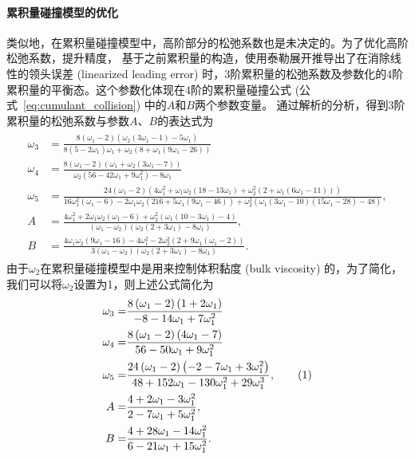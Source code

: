 \paragraph{累积量碰撞模型的优化}
类似地，在累积量碰撞模型中，高阶部分的松弛系数也是未决定的。为了优化高阶松弛系数，提升精度，\citet{Geier-2017} 基于之前累积量的构造，使用泰勒展开推导出了在消除线性的领头误差 (linearized leading error) 时，3阶累积量的松弛系数及参数化的4阶累积量的平衡态。这个参数化体现在4阶的累积量碰撞公式 (公式~\ref{eq:cumulant_collision}) 中的$A$和$B$两个参数变量。\citet{Geier-2017} 通过解析的分析，得到3阶累积量的松弛系数与参数$A$、$B$的表达式为
\begin{align}
    \begin{split}   
\omega_{3} &= \frac{8\left(\omega_{1}-2\right)\left(\omega_{2}\left(3 \omega_{1}-1\right)-5 \omega_{1}\right)}{8\left(5-2 \omega_{1}\right) \omega_{1}+\omega_{2}\left(8+\omega_{1}\left(9 \omega_{1}-26\right)\right)} \\
\omega_{4} &= \frac{8\left(\omega_{1}-2\right)\left(\omega_{1}+\omega_{2}\left(3 \omega_{1}-7\right)\right)}{\omega_{2}\left(56-42 \omega_{1}+9 \omega_{1}^{2}\right)-8 \omega_{1}} \\
\omega_{5} &= \frac{24\left(\omega_{1}-2\right)\left(4 \omega_{1}^{2}+\omega_{1} \omega_{2}\left(18-13 \omega_{1}\right)+\omega_{2}^{2}\left(2+\omega_{1}\left(6 \omega_{1}-11\right)\right)\right)}{16 \omega_{1}^{2}\left(\omega_{1}-6\right)-2 \omega_{1} \omega_{2}\left(216+5 \omega_{1}\left(9 \omega_{1}-46\right)\right)+\omega_{2}^{2}\left(\omega_{1}\left(3 \omega_{1}-10\right)\left(15 \omega_{1}-28\right)-48\right)}, \\
A &= \frac{4 \omega_{1}^{2}+2 \omega_{1} \omega_{2}\left(\omega_{1}-6\right)+\omega_{2}^{2}\left(\omega_{1}\left(10-3 \omega_{1}\right)-4\right)}{\left(\omega_{1}-\omega_{2}\right)\left(\omega_{2}\left(2+3 \omega_{1}\right)-8 \omega_{1}\right)}, \\
B &= \frac{4 \omega_{1} \omega_{2}\left(9 \omega_{1}-16\right)-4 \omega_{1}^{2}-2 \omega_{2}^{2}\left(2+9 \omega_{1}\left(\omega_{1}-2\right)\right)}{3\left(\omega_{1}-\omega_{2}\right)\left(\omega_{2}\left(2+3 \omega_{1}\right)-8 \omega_{1}\right)} .
    \end{split}
\end{align}
由于$\omega_{2}$在累积量碰撞模型中是用来控制体积黏度 (bulk viscosity) 的，为了简化，我们可以将$\omega_{2}$设置为1，则上述公式简化为
\begin{align*}
    \omega_{3} =& \frac{8\left(\omega_{1}-2\right)\left(1+2 \omega_{1}\right)}{-8-14\omega_{1}+7\omega_{1}^2} \\
    \omega_{4} =& \frac{8\left(\omega_{1}-2\right)\left(4 \omega_{1}-7\right)}{56-50\omega_{1}+9\omega_{1}^2} \\
    \omega_{5} =& \frac{24\left(\omega_{1}-2\right)\left(-2-7\omega_{1}+3\omega_{1}^2\right)}{48+152\omega_{1}-130\omega_{1}^2+29\omega_{1}^3}, \stepcounter{equation}\tag{\theequation} \\
    A =& \frac{4+2\omega_{1}-3\omega_{1}^2}{2-7\omega_{1}+5\omega_{1}^2}, \\
    B =& \frac{4+28\omega_{1}-14\omega_{1}^2}{6-21\omega_{1}+15\omega_{1}^2} .
\end{align*}

